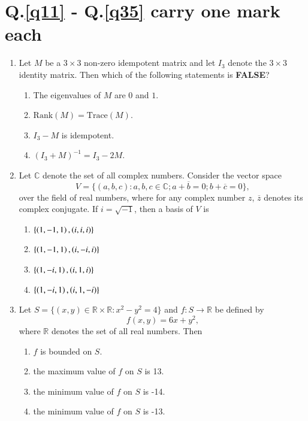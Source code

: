\documentclass[journal,12pt,onecolumn]{IEEEtran}
\theoremstyle{remark}
\begin{document}
\section*{Q.\ref{q11} - Q.\ref{q35} carry one mark each}
\begin{enumerate}
\item \label{q11}
    Let $M$ be a $3 \times 3$ non-zero idempotent matrix and let $I_3$ denote the $3 \times 3$ identity matrix. Then which of the following statements is \textbf{FALSE}?
\begin{enumerate}
    \item The eigenvalues of $M$ are $0$ and $1$.
    \item $\text{Rank}(M) = \text{Trace}(M)$.
    \item $I_3 - M$ is idempotent.
    \item $(I_3 + M)^{-1} = I_3 - 2M$.
\end{enumerate}

\item
Let $\mathbb{C}$ denote the set of all complex numbers. Consider the vector space
\[
V = \{(a, b, c) : a, b, c \in \mathbb{C} ;  a + \overline{b} = 0 ;  b + \overline{c} = 0 \},
\]
over the field of real numbers, where for any complex number $z$, $\overline{z}$ denotes its complex conjugate. If $i = \sqrt{-1}$, then a basis of $V$ is
\begin{enumerate}
    \item $\{\left(1, -1, 1\right), \left(i, i, i\right)\}$
    \item $\{\left(1, -1, 1\right), \left(i, -i, i\right)\}$
    \item $\{\left(1, -i, 1\right), \left(i, 1, i\right)\}$
    \item $\{\left(1, -i, 1\right), \left(i, 1, -i\right)\}$
\end{enumerate}

\item 
Let $S = \{(x, y) \in \mathbb{R} \times \mathbb{R} : x^2 - y^2 = 4\}$ and $f: S \rightarrow \mathbb{R}$ be defined by
\[
f(x, y) = 6x + y^2,
\]
where $\mathbb{R}$ denotes the set of all real numbers. Then
\begin{enumerate}
    \item $f$ is bounded on $S$.
    \item the maximum value of $f$ on $S$ is 13.
    \item the minimum value of $f$ on $S$ is -14.
    \item the minimum value of $f$ on $S$ is -13.
\end{enumerate}

\end{enumerate}
\end{document}
